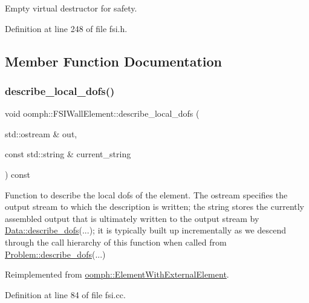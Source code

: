 Empty virtual destructor for safety. 



Definition at line 248 of file fsi.\+h.



\subsection{Member Function Documentation}
\mbox{\label{classoomph_1_1FSIWallElement_afe120348dddfc3acfd95e7d08c2d0a1d}} 
\subsubsection{\texorpdfstring{describe\+\_\+local\+\_\+dofs()}{describe\_local\_dofs()}}
{\footnotesize\ttfamily void oomph\+::\+F\+S\+I\+Wall\+Element\+::describe\+\_\+local\+\_\+dofs (\begin{DoxyParamCaption}\item[{std\+::ostream \&}]{out,  }\item[{const std\+::string \&}]{current\+\_\+string }\end{DoxyParamCaption}) const\hspace{0.3cm}{\ttfamily [virtual]}}



Function to describe the local dofs of the element. The ostream specifies the output stream to which the description is written; the string stores the currently assembled output that is ultimately written to the output stream by \hyperlink{classoomph_1_1Data_a2dae16e2dcff9a40029f834c83364df5}{Data\+::describe\+\_\+dofs}(...); it is typically built up incrementally as we descend through the call hierarchy of this function when called from \hyperlink{classoomph_1_1Problem_abc103804eb319ae0b3d43870cc3e1eaf}{Problem\+::describe\+\_\+dofs}(...) 



Reimplemented from \hyperlink{classoomph_1_1ElementWithExternalElement_a2a1753bed2e822d399aa3525f1bdac4b}{oomph\+::\+Element\+With\+External\+Element}.



Definition at line 84 of file fsi.\+cc.



